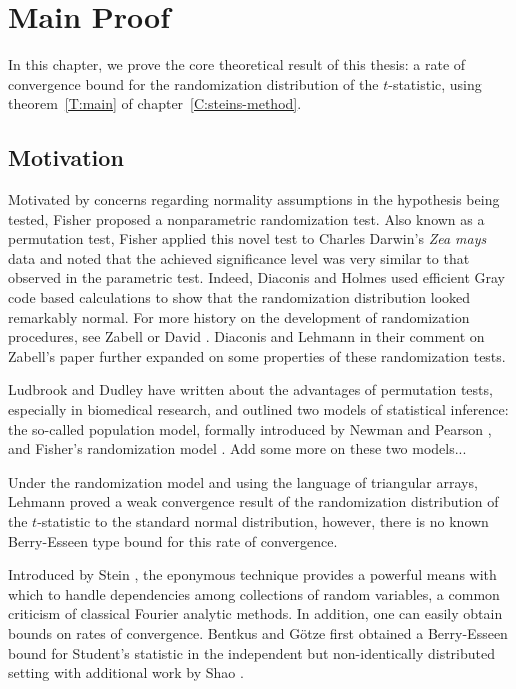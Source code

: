 \chapter{Main Proof}
\label{C:stein-proof}
In this chapter, we prove the core theoretical result of this thesis: a rate of convergence bound for
the randomization distribution of the $t$-statistic, using theorem~\ref{T:main} of
chapter~\ref{C:steins-method}.

\section{Motivation}
Motivated by concerns regarding normality assumptions in the hypothesis being tested, Fisher
\cite{fisher1935design} proposed a nonparametric randomization test.  Also known as a permutation
test, Fisher applied this novel test to Charles Darwin's \emph{Zea mays} data and noted that the
achieved significance level was very similar to that observed in the parametric test.  Indeed,
Diaconis and Holmes \cite{diaconis1994gray} used efficient Gray code based calculations to show that
the randomization distribution looked remarkably normal.  For more history on the development of
randomization procedures, see Zabell \cite{zabell2008student} or David \cite{david2008beginnings}.
Diaconis and Lehmann \cite{diaconis2008comment} in their comment on Zabell's paper further expanded
on some properties of these randomization tests.

Ludbrook and Dudley \cite{ludbrook1998permutation} have written about the advantages of permutation
tests, especially in biomedical research, and outlined two models of statistical inference: the
so-called population model, formally introduced by Newman and Pearson \cite{neyman1928use}, and
Fisher's randomization model \cite{fisher1935design}.  Add some more on these two models...

Under the randomization model and using the language of triangular arrays, Lehmann
\cite{lehmann1999elements} proved a weak convergence result of the randomization distribution of the
$t$-statistic to the standard normal distribution, however, there is no known Berry-Esseen type
bound for this rate of convergence.

Introduced by Stein \cite{stein1986approximate}, the eponymous technique
provides a powerful means with which to handle dependencies among collections of random variables, a
common criticism of classical Fourier analytic methods.  In addition, one can easily obtain bounds
on rates of convergence.  Bentkus and G{\"o}tze \cite{bentkus1996berry} first obtained a
Berry-Esseen bound for Student's statistic in the independent but non-identically distributed
setting with additional work by Shao \cite{shao2005explicit}.

